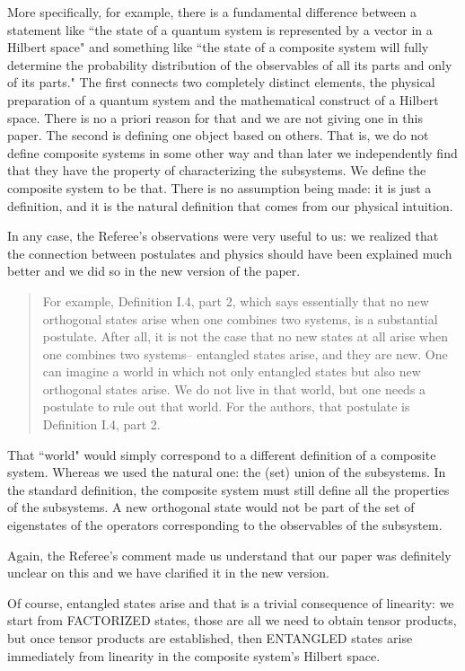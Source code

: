 \documentclass[11pt]{article}
\begin{document}
More specifically, for example, there is a fundamental difference between a statement
like ``the state of a quantum system is represented by a vector in a
Hilbert space" and something like ``the state of a composite system
will fully determine the probability distribution of the observables of
all its parts and only of its parts." The first connects two
completely distinct elements, the physical preparation of a quantum
system and the mathematical construct of a Hilbert space. There is no
a priori reason for that and we are not giving one in this paper. The
second is defining one object based on others. That is, we do not
define composite systems in some other way and than later we
independently find that they have the property of characterizing the
subsystems.  We define the composite system to be that. There is no
assumption being made: it is just a definition, and it is the natural
definition that comes from our physical intuition.

In any case, the Referee's observations were very useful to us: we realized that the connection between postulates and physics should have been explained much better and we did so in the new version of the paper.

\begin{quote} For
example, Definition I.4, part 2, which says essentially that no new
orthogonal states arise when one combines two systems, is a
substantial postulate. After all, it is not the case that no new
states at all arise when one combines two systems-- entangled states
arise, and they are new. One can imagine a world in which not only
entangled states but also new orthogonal states arise. We do not live
in that world, but one needs a postulate to rule out that world. For
the authors, that postulate is Definition I.4, part 2.
\end{quote}

That ``world" would simply correspond to a different definition of a composite system. Whereas we used the natural one: the (set) union of the subsystems. 
In the standard definition, the
composite system must still define all the properties of the subsystems. A new orthogonal state would not be part of the set of eigenstates of the
operators corresponding to the observables of the subsystem.

Again, the Referee's comment made us understand that our paper was definitely unclear on this and we have
clarified it in the new version. 

Of course, entangled states arise and that is a
trivial consequence of linearity: we start from FACTORIZED states,
those are all we need to obtain tensor products, but once tensor
products are established, then ENTANGLED states arise immediately from
linearity in the composite system's Hilbert space.
\end{document}
